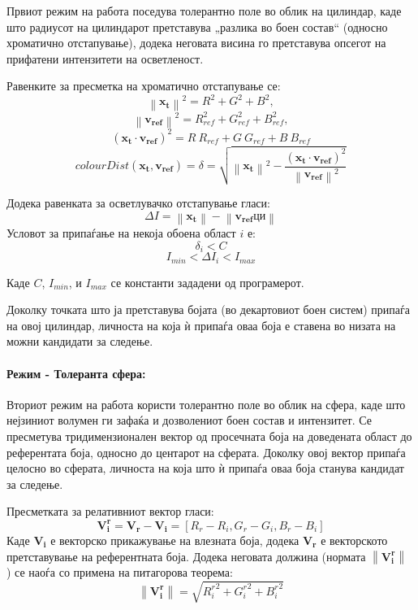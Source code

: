 \documentclass[12pt]{article}
\newcommand\norm[1]{\left\lVert#1\right\rVert}
\renewcommand{\vec}[1]{\mathbf{#1}}
\begin{document}
        Првиот режим на работа поседува толерантно поле во облик на цилиндар, каде што радиусот на цилиндарот претставува „разлика во боен состав“ (односно хроматично отстапување), додека неговата висина го претставува опсегот на прифатени интензитети на осветленост.

        Равенките за пресметка на хроматично отстапување се:
        $$  \norm{\vec{x_t}}^2 = R^2 + G^2 + B^2,$$
        $$  \norm{\vec{v_{ref}}}^2 = R_{ref}^2 + G_{ref}^2 + B_{ref}^2, $$
        $$    (\vec{x_t} \cdot \vec{v_{ref}})^2 = R\ R_{ref} + G\ G_{ref} + B\ B_{ref} $$
        $$    colourDist(\vec{x_t}, \vec{v_{ref}}) = \delta = \sqrt{\norm{\vec{x_t}}^2 - \frac{(\vec{x_t} \cdot \vec{v_{ref}})^2}{\norm{\vec{v_{ref}}}^2}} $$
        \bigbreak

        Додека равенката за осветлувачко отстапување гласи:
        $$ \Delta I = \norm{\vec{x_t}} - \norm{\vec{v_{ref}} ци} $$
        \bigbreak
        Условот за припаѓање на некоја обоена област $i$ е:
        $$ \delta_{i} < C $$
        $$ I_{min}< \Delta I_i < I_{max} $$

        Каде $C$, $I_{min}$, и $I_{max}$ се константи зададени од програмерот.

        Доколку точката што ја претставува бојата (во декартовиот боен систем) припаѓа на овој цилиндар, личноста на која ѝ припаѓа оваа боја е ставена во низата на можни кандидати за следење.

      \paragraph{Режим - Толеранта сфера:\\}

        Вториот режим на работа користи толерантно поле во облик на сфера, каде што нејзиниот волумен ги зафаќа и дозволениот боен состав и интензитет. Се пресметува тридимензионален вектор од просечната боја на доведената област до референтата боја, односно до центарот на сферата. Доколку овој вектор припаѓа целосно во сферата, личноста на која што ѝ припаѓа оваа боја станува кандидат за следење.

        Пресметката за релативниот вектор гласи:
        $$ \vec{V_i^r} = \vec{V_r} - \vec{V_i}= [R_r - R_i, G_r - G_i, B_r - B_i] $$
        Каде $\vec{V_i}$ е векторско прикажување на влезната боја, додека $\vec{V_r}$ е векторското претставување на референтната боја.
        Додека неговата должина (нормата $\norm{\vec{V_i^r}}$ ) се наоѓа со примена на питагорова теорема:
        $$ \norm{\vec{V_i^r}} = \sqrt{{R_i^r}^2 + {G_i^r}^2 + {B_i^r}^2} $$
\end{document}
